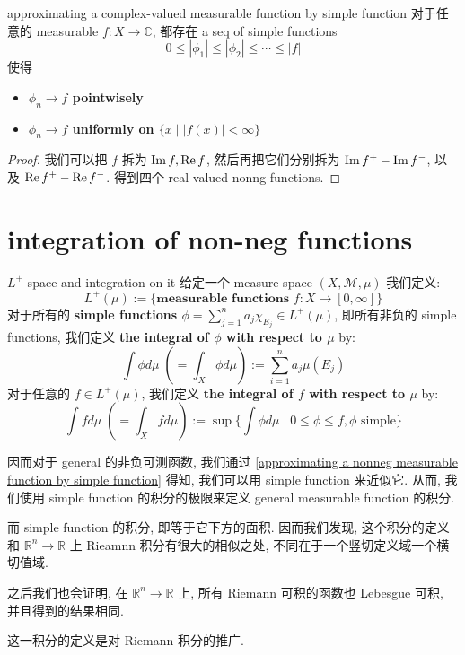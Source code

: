 \documentclass[lang=cn,11pt]{elegantbook}
\begin{document}
\begin{corollary}{approximating a complex-valued measurable function by simple function}
对于任意的 measurable $f:X\rightarrow \mathbb{C}$, 都存在 a seq of simple functions $$0 \leq |\phi_1| \leq |\phi_2| \leq \cdots \leq |f|$$ 使得 
\begin{itemize}
    \item \textbf{$\phi_n \rightarrow f$ pointwisely}
    \item \textbf{$\phi_n \rightarrow f$ uniformly on $\{ x \mid |f(x)| < \infty\}$}
\end{itemize}
\end{corollary}

\begin{proof}
    我们可以把 $f$ 拆为 $\operatorname{Im} f, \operatorname{Re} f$, 然后再把它们分别拆为 $\operatorname{Im} f^+ - \operatorname{Im} f^-$, 以及 $\operatorname{Re} f^+ - \operatorname{Re} f^-$. 得到四个 real-valued nonng functions.
\end{proof}




\section{integration of non-neg functions}


\begin{definition}{$L^+$ space and integration on it}
给定一个 measure space $(X, \mathcal{M},\mu)$
    我们定义: $$
    L^+(\mu)  := \{  \textbf{measurable functions }  f: X \rightarrow [0,\infty]   \} $$
对于所有的 \textbf{simple functions $\phi = \sum_{j=1}^n a_j \chi_{E_j} \in L^+(\mu)$}, 即所有非负的 simple functions, 我们定义\textbf{ the integral of $\phi$ with respect to $\mu$} by:
$$\int \phi d \mu  \;(= \int_X   \phi d\mu  ) := \sum_{i=1}^n a_j \mu(E_j)$$
对于任意的 $f \in L^+(\mu)$, 我们定义 \textbf{the integral of $f$ with respect to $\mu$ }by: 
$$ \int f d \mu \;(= \int_X  fd\mu ) := \sup \{   \int \phi d\mu \mid 0\leq \phi \leq f, \phi  \text{ simple} \}$$
\end{definition}

\begin{remark}
因而对于 general 的非负可测函数, 我们通过 \ref{approximating a nonneg measurable function by simple function} 得知, 我们可以用 simple function 来近似它. 从而, 我们使用 simple function 的积分的极限来定义 general measurable function 的积分.

而 simple function 的积分, 即等于它下方的面积. 因而我们发现, 这个积分的定义和 $\mathbb{R}^n \rightarrow \mathbb{R}$ 上 Rieamnn 积分有很大的相似之处, 不同在于一个竖切定义域一个横切值域.

之后我们也会证明, 在 $\mathbb{R}^n \rightarrow \mathbb{R}$ 上, 所有 Riemann 可积的函数也 Lebesgue 可积, 并且得到的结果相同.

这一积分的定义是对 Riemann 积分的推广.
\end{remark}
\end{document}
